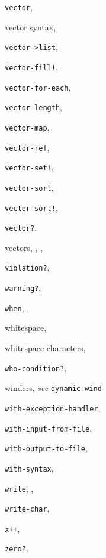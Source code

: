 {\begin{multicols}{2}
\texttt{vector}, \textit{\pageref{objects_s231}}
  
vector syntax, \pageref{grammar_s22}
  
\texttt{vector-\textgreater{}list}, \textit{\pageref{objects_s237}}
  
\texttt{vector-fill!}, \textit{\pageref{objects_s236}}
  
\texttt{vector-for-each}, \textit{\pageref{control_s47}}
  
\texttt{vector-length}, \textit{\pageref{objects_s233}}
  
\texttt{vector-map}, \textit{\pageref{control_s44}}
  
\texttt{vector-ref}, \textit{\pageref{objects_s234}}
  
\texttt{vector-set!}, \textit{\pageref{objects_s235}}
  
\texttt{vector-sort}, \textit{\pageref{objects_s239}}
  
\texttt{vector-sort!}, \textit{\pageref{objects_s239}}
  
\texttt{vector?}, \textit{\pageref{objects_s21}}
  
vectors, \pageref{start_s193}, \pageref{objects_s230}, \pageref{examples_s3}
  
\texttt{violation?}, \textit{\pageref{exceptions_s20}}
  
\texttt{warning?}, \textit{\pageref{exceptions_s23}}
  
\texttt{when}, \pageref{further_s30}, \textit{\pageref{control_s17}}
  
whitespace, \pageref{grammar_s2}
  
whitespace characters, \pageref{intro_s41}
  
\texttt{who-condition?}, \textit{\pageref{exceptions_s26}}
  
winders, \textit{see} \texttt{dynamic-wind}
  
\texttt{with-exception-handler}, \textit{\pageref{exceptions_s7}}
  
\texttt{with-input-from-file}, \textit{\pageref{io_s79}}
  
\texttt{with-output-to-file}, \textit{\pageref{io_s80}}
  
\texttt{with-syntax}, \textit{\pageref{syntax_s38}}
  
\texttt{write}, \textit{\pageref{io_s84}}, \pageref{examples_s32}
  
\texttt{write-char}, \textit{\pageref{io_s86}}
  
\texttt{x++}, \pageref{syntax_s63}
  
\texttt{zero?}, \textit{\pageref{objects_s93}}
\end{multicols}
}
